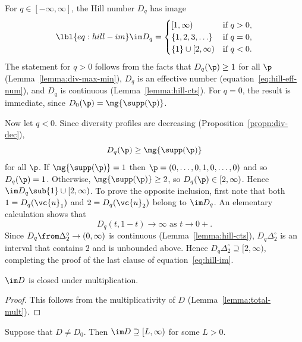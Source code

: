 \begin{example}
% 
For $q \in [-\infty, \infty]$, the Hill number $D_q$ has image
% 
\begin{equation}
\lbl{eq:hill-im}
\im D_q
=
\begin{cases}
[1, \infty)             &\text{if } q > 0,      \\
\{1, 2, 3, \ldots \}    &\text{if } q = 0,      \\
\{1\} \cup [2, \infty)  &\text{if } q < 0.
\end{cases}
\end{equation}
% 
The statement for $q > 0$ follows from the facts that $D_q(\p) \geq 1$ for
all $\p$ (Lemma~\ref{lemma:div-max-min}), $D_q$ is an
effective number (equation~\eqref{eq:hill-eff-num}), and $D_q$ is
continuous (Lemma~\ref{lemma:hill-cts}).  For $q =
0$, the result is immediate, since $D_0(\p) = \mg{\supp(\p)}$.

Now let $q < 0$.  Since diversity profiles are decreasing
(Proposition~\ref{propn:div-dec}),
\[
D_q(\p) \geq \mg{\supp(\p)}
\]
for all $\p$.  If $\mg{\supp(\p)} = 1$ then $\p = (0, \ldots, 0, 1, 0,
\ldots, 0)$ and so $D_q(\p) = 1$.  Otherwise, $\mg{\supp(\p)} \geq 2$, so
$D_q(\p) \in [2, \infty)$.  Hence $\im D_q \sub \{1\} \cup [2, \infty)$.
    To prove the opposite inclusion, first note that both $1 =
    D_q(\vc{u}_1)$ and $2 = D_q(\vc{u}_2)$ belong to $\im D_q$.  An
    elementary calculation shows that
\[
D_q(t, 1 - t) \to \infty \text{ as } t \to {0+}.
\]
Since $D_q \from \Delta_2^\circ \to (0, \infty)$ is continuous 
(Lemma~\ref{lemma:hill-cts}), $D_q
\Delta_2^\circ$ is an interval that contains $2$ and is unbounded above.
Hence $D_q \Delta_2^\circ \supseteq [2, \infty)$, completing the proof of
  the last clause of equation~\eqref{eq:hill-im}.
\end{example}

\begin{lemma}
$\im D$ is closed under multiplication.
\end{lemma}

\begin{proof}
This follows from the multiplicativity of $D$
(Lemma~\ref{lemma:total-mult}). 
\end{proof}

\begin{lemma}
Suppose that $D \neq D_0$.  Then $\im D \supseteq [L, \infty)$ for some $L
  > 0$. 
\end{lemma}

